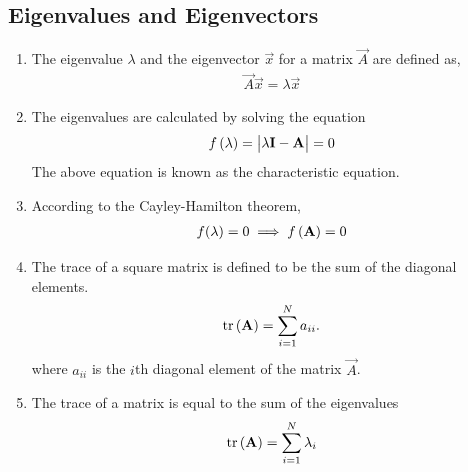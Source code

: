 \documentclass[journal,12pt,twocolumn]{IEEEtran}
\renewcommand\thesection{\arabic{section}}
\renewcommand\thesubsection{\thesection.\arabic{subsection}}
\begin{document}
\subsection{Eigenvalues and Eigenvectors}
\renewcommand{\theequation}{\theenumi}
\begin{enumerate}[label=\thesubsection.\arabic*.,ref=\thesubsection.\theenumi]
\item The eigenvalue $\lambda$ and the eigenvector $\vec{x}$  for a matrix $\vec{A}$ are defined as, 
\begin{align}
  \vec{A} \vec{x} = \lambda \vec{x}
\end{align}
\item The eigenvalues are calculated by solving the
equation
\begin{align}
  \label{eq:chareq}
f\left(\lambda\right) = \begin{vmatrix}\lambda \mathbf{I}- \mathbf{A} \end{vmatrix} =0
\end{align}
The above equation is known as the characteristic equation.
\item According to the Cayley-Hamilton theorem,
\begin{align}
	\label{eq:cayley}
  f(\lambda) = 0 \implies f\left(\mathbf{A}\right) = 0
\end{align}
\item The trace of a square  matrix is defined to be the sum of the diagonal elements.
\begin{align}
	\label{eq:trace}
	\text{tr}\left(\mathbf{A}\right)=\sum_{i=1}^{N}a_{ii}.
\end{align}
	where $a_{ii}$ is the $i$th diagonal element of the matrix $\vec{A}$. 	
\item The trace of a matrix is equal to the sum of the eigenvalues
\begin{align}
	\label{eq:trace_eig}
	\text{tr}\left(\mathbf{A}\right)=\sum_{i=1}^{N}\lambda_i
\end{align}


\end{enumerate}
\end{document}
